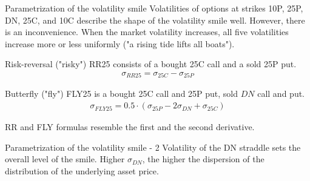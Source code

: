 \documentclass{beamer}
\begin{document}
\begin{frame}{Parametrization of the volatility smile}
\justify
Volatilities of options at strikes 10P, 25P, DN, 25C, and 10C describe the shape of the volatility smile well. However, there is an inconvenience. When the market volatility increases, all five volatilities increase more or less uniformly ("a rising tide lifts all boats").

\justify
\alert{Risk-reversal ("risky")} RR25 consists of a bought 25C call and a sold 25P put.
\begin{align*}
\sigma_{RR25} = \sigma_{25C} - \sigma_{25P}
\end{align*}

\justify
\alert{Butterfly ("fly")} FLY25 is a bought 25C call and 25P put, sold $DN$ call and put.
\begin{align*}
\sigma_{FLY25} = 0.5\cdot(\sigma_{25P} - 2\sigma_{DN} + \sigma_{25C})
\end{align*}

\justify
RR and FLY formulas resemble the first and the second derivative.
\end{frame}



\begin{frame}{Parametrization of the volatility smile - 2}
\justify
Volatility of the DN straddle sets the overall level of the smile. Higher $\sigma_{DN}$, the higher the dispersion of the distribution of the underlying asset price.

\centering
{}
\end{frame}
\end{document}
